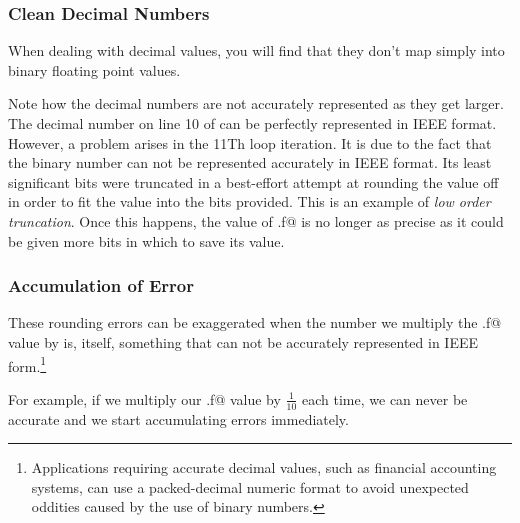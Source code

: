 
\subsubsection{Clean Decimal Numbers}
When dealing with decimal values, you will find that they don't map simply
into binary floating point values.

Note how the decimal numbers are not accurately represented as they get larger.
The decimal number on line 10 of 
can be perfectly represented in IEEE format.  However, a problem arises in
the 11Th loop iteration.  It is due to the fact that the
binary number can not be represented accurately in IEEE format.  Its least
significant bits were truncated in a best-effort attempt at rounding the value
off in order to fit the value into the bits provided.  This is an example of
{\em low order truncation}.  Once this happens, the value of \verb@x.f@ is
no longer as precise as it could be given more bits in which to save its value.



\subsubsection{Accumulation of Error}

These rounding errors can be exaggerated when the number we multiply
the \verb@x.f@ value by is, itself, something that can not be accurately
represented in IEEE
form.\footnote{Applications requiring accurate decimal values, such as
financial accounting systems, can use a packed-decimal numeric format
to avoid unexpected oddities caused by the use of binary numbers.}

For example, if we multiply our \verb@x.f@ value by $\frac{1}{10}$ each time,
we can never be accurate and we start accumulating errors immediately.



